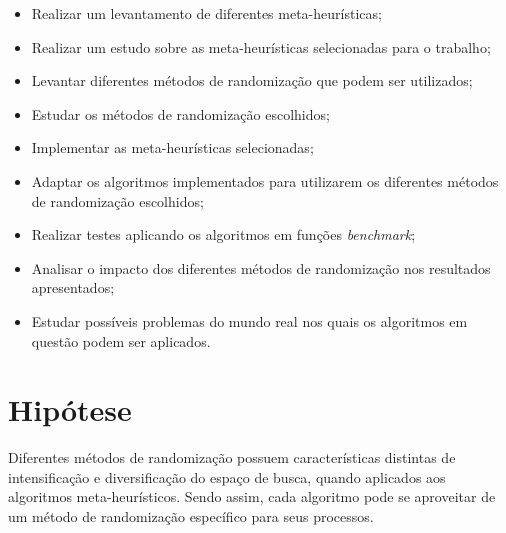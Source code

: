 \begin{itemize}
    \item Realizar um levantamento de diferentes meta-heurísticas;
    \item Realizar um estudo sobre as meta-heurísticas selecionadas para o trabalho;
    \item Levantar diferentes métodos de randomização que podem ser utilizados;
    \item Estudar os métodos de randomização escolhidos;
    \item Implementar as meta-heurísticas selecionadas;
    \item Adaptar os algoritmos implementados para utilizarem os diferentes métodos de randomização escolhidos;
    \item Realizar testes aplicando os algoritmos em funções \textit{benchmark};
    \item Analisar o impacto dos diferentes métodos de randomização nos resultados apresentados;
    \item Estudar possíveis problemas do mundo real nos quais os algoritmos em questão podem ser aplicados.
\end{itemize}

\section{Hipótese}

Diferentes métodos de randomização possuem características distintas de intensificação e diversificação do espaço de busca, quando aplicados aos algoritmos meta-heurísticos. Sendo assim, cada algoritmo pode se aproveitar de um método de randomização específico para seus processos.
